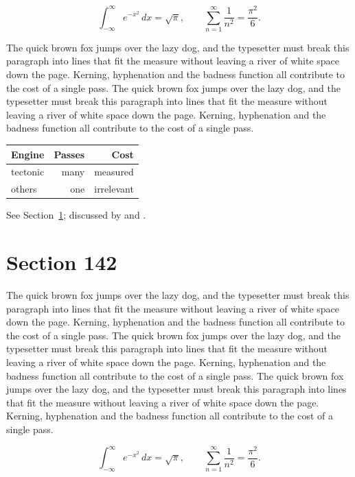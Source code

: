\documentclass{article}
\begin{document}
\begin{equation}\label{eq:141}
\int_{-\infty}^{\infty} e^{-x^{2}}\,dx = \sqrt{\pi}, \qquad
\sum_{n=1}^{\infty} \frac{1}{n^{2}} = \frac{\pi^{2}}{6}.
\end{equation}

The quick brown fox jumps over the lazy dog, and the typesetter must break this paragraph into lines that fit the measure without leaving a river of white space down the page. Kerning, hyphenation and the badness function all contribute to the cost of a single pass. The quick brown fox jumps over the lazy dog, and the typesetter must break this paragraph into lines that fit the measure without leaving a river of white space down the page. Kerning, hyphenation and the badness function all contribute to the cost of a single pass. 

\begin{center}
\begin{tabular}{lrr}
\toprule
Engine & Passes & Cost \\
\midrule
tectonic & many & measured \\
others & one & irrelevant \\
\bottomrule
\end{tabular}
\end{center}

See Section~\ref{sec:142}; discussed by \textcite{k2} and \textcite{l4}.
\section{Section 142}
\label{sec:142}
The quick brown fox jumps over the lazy dog, and the typesetter must break this paragraph into lines that fit the measure without leaving a river of white space down the page. Kerning, hyphenation and the badness function all contribute to the cost of a single pass. The quick brown fox jumps over the lazy dog, and the typesetter must break this paragraph into lines that fit the measure without leaving a river of white space down the page. Kerning, hyphenation and the badness function all contribute to the cost of a single pass. The quick brown fox jumps over the lazy dog, and the typesetter must break this paragraph into lines that fit the measure without leaving a river of white space down the page. Kerning, hyphenation and the badness function all contribute to the cost of a single pass. 

\begin{equation}\label{eq:142}
\int_{-\infty}^{\infty} e^{-x^{2}}\,dx = \sqrt{\pi}, \qquad
\sum_{n=1}^{\infty} \frac{1}{n^{2}} = \frac{\pi^{2}}{6}.
\end{equation}
\end{document}
